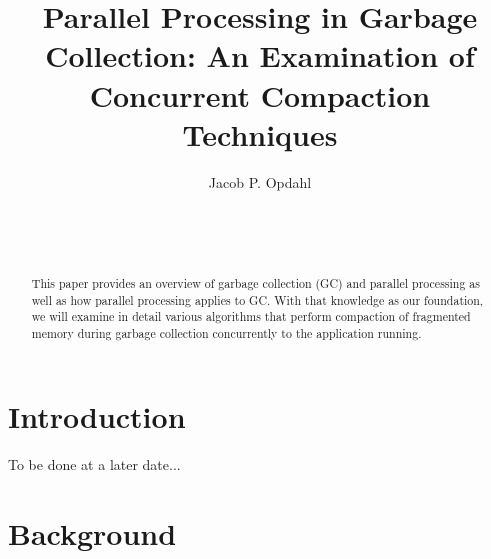 \documentclass{sig-alternate}
\begin{document}

\title{Parallel Processing in Garbage Collection: An Examination of Concurrent Compaction Techniques}


\author{
\alignauthor
Jacob P. Opdahl\\
	\\
	\\
	\\
}

\maketitle
\begin{abstract}
This paper provides an overview of garbage collection (GC) and parallel
processing as well as how parallel processing applies to GC.
With that knowledge as our foundation, we will examine in detail various
algorithms that perform compaction of fragmented memory during garbage 
collection concurrently to the application running.
\end{abstract}


\section{Introduction}
\label{sec:introduction}

To be done at a later date...


\section{Background}
\label{sec:background}
\end{document}
